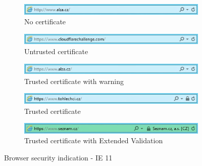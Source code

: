 \begin{figure}
  \begin{subfigure}[b]{\textwidth}
    \centering
    \includegraphics[scale=0.6]{images/browsers/ie-none.png}
    \caption{No certificate}
  \end{subfigure}
  \begin{subfigure}[b]{\textwidth}
    \centering
    \includegraphics[scale=0.6]{images/browsers/ie-untrusted.png}
    \caption{Untrusted certificate}
  \end{subfigure}
  \begin{subfigure}[b]{\textwidth}
    \centering
    \includegraphics[scale=0.6]{images/browsers/ie-warning.png}
    \caption{Trusted certificate with warning}
  \end{subfigure}
  \begin{subfigure}[b]{\textwidth}
    \centering
    \includegraphics[scale=0.6]{images/browsers/ie-dv.png}
    \caption{Trusted certificate}
  \end{subfigure}
  \begin{subfigure}[b]{\textwidth}
    \centering
    \includegraphics[scale=0.6]{images/browsers/ie-ev.png}
    \caption{Trusted certificate with Extended Validation}
  \end{subfigure}
  \caption{Browser security indication - IE 11}
\end{figure}

